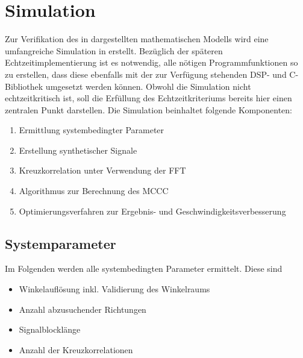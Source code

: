 \section{Simulation}
\label{sec:Simulation}
Zur Verifikation des in  dargestellten mathematischen Modells wird eine umfangreiche Simulation in \matlab erstellt. Bezüglich der späteren Echtzeitimplementierung ist es notwendig, alle nötigen Programmfunktionen so zu erstellen, dass diese ebenfalls mit der zur Verfügung stehenden DSP- und C-Bibliothek umgesetzt werden können. Obwohl die Simulation nicht echtzeitkritisch ist, soll die Erfüllung des Echtzeitkriteriums bereits hier einen zentralen Punkt darstellen. Die Simulation beinhaltet folgende Komponenten:

\begin{enumerate}
    \item Ermittlung systembedingter Parameter %
    \item Erstellung synthetischer Signale
    \item Kreuzkorrelation unter Verwendung der FFT
    \item Algorithmus zur Berechnung des MCCC
    \item Optimierungsverfahren zur Ergebnis- und Geschwindigkeitsverbesserung
\end{enumerate}


\subsection{Systemparameter}
\label{subsec:Systemparameter}
Im Folgenden werden alle systembedingten Parameter ermittelt. Diese sind

\begin{itemize}
    \item Winkelauflösung inkl. Validierung des Winkelraums
    \item Anzahl abzusuchender Richtungen
    \item Signalblocklänge
    \item Anzahl der Kreuzkorrelationen
\end{itemize}





